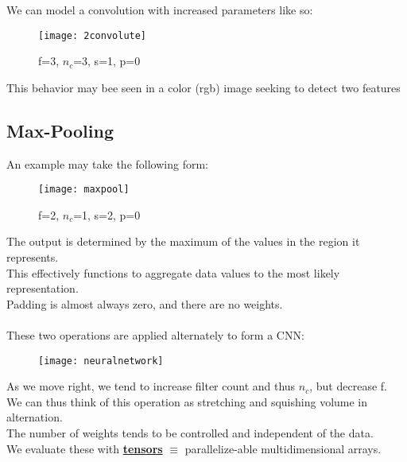 \documentclass[../../lecture_notes.tex]{subfiles}
\begin{document}
\noindent We can model a convolution with increased parameters like so:

\begin{center}\begin{figure}[H]
	\texttt{[image: 2convolute]}
	\caption{f=3, $n_c$=3, s=1, p=0}
\end{figure}\end{center}

\noindent This behavior may bee seen in a color (rgb) image seeking to detect two features

\subsection*{Max-Pooling}
\noindent An example may take the following form:

\begin{center}\begin{figure}[H]
	\texttt{[image: maxpool]}
	\caption{f=2, $n_c$=1, s=2, p=0}
\end{figure}\end{center}

\noindent The output is determined by the maximum of the values in the region it represents.\\
This effectively functions to aggregate data values to the most likely representation.\\
Padding is almost always zero, and there are no weights.\\
\\
These two operations are applied alternately to form a CNN:

\begin{center}\begin{figure}[H]
	\texttt{[image: neuralnetwork]}
\end{figure}\end{center}

\noindent As we move right, we tend to increase filter count and thus $n_c$, but decrease f.\\
We can thus think of this operation as stretching and squishing volume in alternation.\\
The number of weights tends to be controlled and independent of the data.\\
We evaluate these with \textbf{\underline{tensors}} $\equiv$ parallelize-able multidimensional arrays.\\
\end{document}
